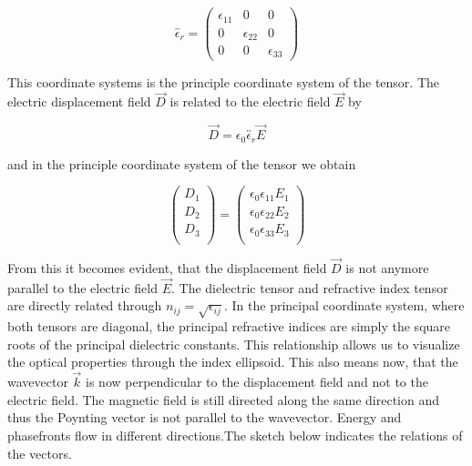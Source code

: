 \documentclass[
  a4paper,
]{book}
\begin{document}
\[
\overleftrightarrow{\epsilon_r}=
\begin{pmatrix}
\epsilon_{11} & 0 & 0 \\
0 & \epsilon_{22} & 0 \\
0 & 0 & \epsilon_{33}
\end{pmatrix}\tag{dielectric tensor}
\]

This coordinate systems is the principle coordinate system of the
tensor. The electric displacement field \(\vec{D}\) is related to the
electric field \(\vec{E}\) by

\[
\vec{D}=\epsilon_0 \overleftrightarrow{\epsilon_r} \vec{E}
\]

and in the principle coordinate system of the tensor we obtain

\[
\begin{pmatrix}
D_1 \\
D_2 \\
D_3 \\
\end{pmatrix}
=
\begin{pmatrix}
\epsilon_0\epsilon_{11} E_1\\
\epsilon_0\epsilon_{22} E_2\\
\epsilon_0\epsilon_{33} E_3\\
\end{pmatrix}
\]

From this it becomes evident, that the displacement field \(\vec{D}\) is
not anymore parallel to the electric field \(\vec{E}\). The dielectric
tensor and refractive index tensor are directly related through
\(n_{ij} = \sqrt{\epsilon_{ij}}\). In the principal coordinate system,
where both tensors are diagonal, the principal refractive indices are
simply the square roots of the principal dielectric constants. This
relationship allows us to visualize the optical properties through the
index ellipsoid. This also means now, that the wavevector \(\vec{k}\) is
now perpendicular to the displacement field and not to the electric
field. The magnetic field is still directed along the same direction and
thus the Poynting vector is not parallel to the wavevector. Energy and
phasefronts flow in different directions.The sketch below indicates the
relations of the vectors.
\end{document}
